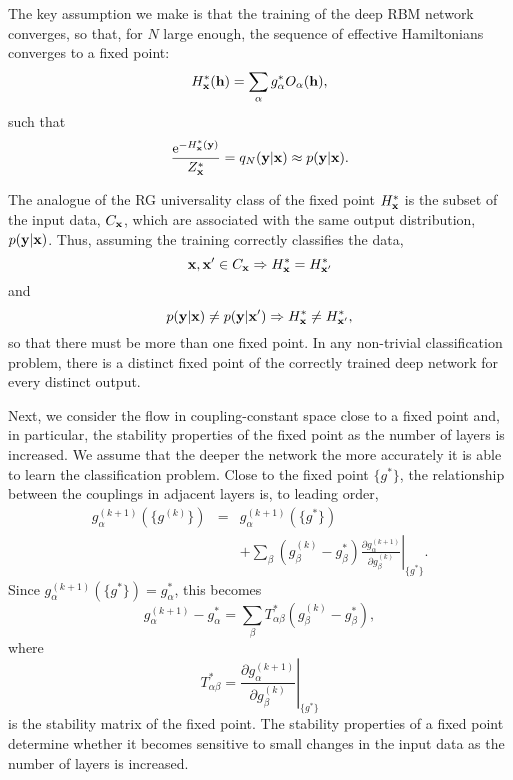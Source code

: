 \documentclass[reprint,amsmath,amssymb,aps]{revtex4-1}
\begin{document}
The key assumption we make is that the training of the deep RBM network converges, so that, for $N$ large enough, the sequence of effective Hamiltonians converges to a fixed point: 
\begin{equation}
H^*_{\bf x}({\bf h}) = \sum_\alpha{g^*_\alpha O_\alpha({\bf h})},
\label{eq:fixed point Hamiltonian}
\end{equation}
such that
\begin{equation}
\frac{{\rm e}^{-H^*_{\bf x}({\bf y})}}{Z^*_{\bf x}} = q_N({\bf y}|{\bf x}) \approx p({\bf y}|{\bf x}).
\label{eq:fixed point}
\end{equation}

The analogue of the RG universality class of the fixed point $H^*_{\bf x}$ is the subset of the input data, $C_{\bf x}$, which are associated with the same output distribution, $p({\bf y}|{\bf x})$. Thus, assuming the training correctly classifies the data,
\begin{equation}
{\bf x}, {\bf x}' \in C_{\bf x} \Rightarrow H^*_{\bf x} = H^*_{{\bf x}'}
\label{eq:universality class}
\end{equation}
and
\begin{equation}
p({\bf y}|{\bf x}) \neq p({\bf y}|{\bf x}') \Rightarrow H^*_{\bf x} \neq H^*_{{\bf x}'},
\label{eq:different fixed points}
\end{equation}
so that there must be more than one fixed point. In any non-trivial classification problem, there is a distinct fixed point of the correctly trained deep network for every distinct output.

Next, we consider the flow in coupling-constant space close to a fixed point and, in particular, the stability properties of the fixed point as the number of layers is increased. We assume that the deeper the network the more accurately it is able to learn the classification problem. Close to the fixed point $\{g^*\}$, the relationship between the couplings in adjacent layers is, to leading order,
\begin{eqnarray}
g^{(k+1)}_\alpha(\{g^{(k)}\}) &=& g^{(k+1)}_\alpha(\{g^*\}) \nonumber\\
&& + \sum_\beta{(g^{(k)}_\beta - g^*_\beta)\left.\frac{\partial g^{(k+1)}_\alpha}{\partial g^{(k)}_\beta}\right|_{\{g^*\}}}.
\end{eqnarray}
Since $g^{(k+1)}_\alpha(\{g^*\}) = g^*_\alpha$, this becomes
\begin{equation}
g^{(k+1)}_\alpha - g^*_\alpha = \sum_\beta{T^*_{\alpha\beta}(g^{(k)}_\beta - g^*_\beta)},
\label{eq:coupling flow}
\end{equation}
where
\begin{equation}
T^*_{\alpha\beta} = \left.\frac{\partial g^{(k+1)}_\alpha}{\partial g^{(k)}_\beta}\right|_{\{g^*\}}
\label{eq:stability matrix}
\end{equation}
is the stability matrix of the fixed point. The stability properties of a fixed point determine whether it becomes sensitive to small changes in the input data as the number of layers is increased.
\end{document}
